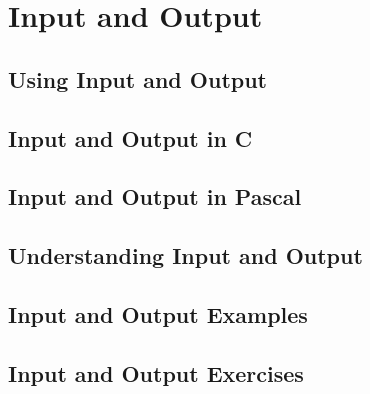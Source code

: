 \chapter{Input and Output} %
\label{cha:input_and_output}

\minitoc



\clearpage
\section{Using Input and Output} %
\label{sec:using_input_and_output}


\clearpage
\section{Input and Output in C} %
\label{sec:input_and_output_in_c}


\clearpage
\section{Input and Output in Pascal} %
\label{sec:input_and_output_in_pascal}


\clearpage
\section{Understanding Input and Output} %
\label{sec:understanding_input_and_output}


\clearpage
\section{Input and Output Examples} %
\label{sec:input_and_output_examples}


\clearpage
\section{Input and Output Exercises} %
\label{sec:input_and_output_exercises}


